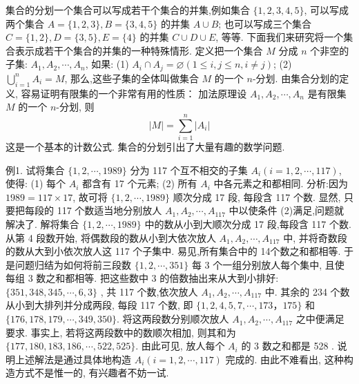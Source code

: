 
集合的分划一个集合可以写成若干个集合的并集,例如集合 $\{1,2, 3, 4, 5\}$, 可以写成两个集合 $A=\{1,2,3\}, B=\{3,4,5\}$ 的并集 $A \cup B$; 也可以写成三个集合 $C=\{1,2\}, D=\{3,5\}, E=\{4\}$ 的并集 $C \cup D \cup E$, 等等.
下面我们来研究将一个集合表示成若干个集合的并集的一种特殊情形.
定义把一个集合 $M$ 分成 $n$ 个非空的子集: $A_1, A_2, \cdots, A_n$, 如果:
(1) $A_i \cap A_j=\varnothing(1 \leqslant i, j \leqslant n, i \neq j)$;
(2) $\bigcup_{i=1}^n A_i=M$,
那么,这些子集的全体叫做集合 $M$ 的一个 $n$-分划.
由集合分划的定义, 容易证明有限集的一个非常有用的性质：
加法原理设 $A_1, A_2, \cdots, A_n$ 是有限集 $M$ 的一个 $n$-分划, 则
$$
|M|=\sum_{i=1}^n\left|A_i\right|
$$
这是一个基本的计数公式.
集合的分划引出了大量有趣的数学问题.



例1. 试将集合 $\{1,2, \cdots, 1989\}$ 分为 117 个互不相交的子集 $A_i ( i=1, 2, \cdots, 117)$, 使得:
(1) 每个 $A_i$ 都含有 17 个元素;
(2) 所有 $A_i$ 中各元素之和都相同.
分析:因为 $1989=117 \times 17$, 故可将 $\{1,2, \cdots, 1989\}$ 顺次分成 17 段, 每段含 117 个数.
显然, 只要把每段的 117 个数适当地分别放人 $A_1, A_2, \cdots, A_{117}$ 中以使条件 (2)满足,问题就解决了.
解将集合 $\{1,2, \cdots, 1989\}$ 中的数从小到大顺次分成 17 段,每段含 117 个数.
从第 4 段数开始, 将偶数段的数从小到大依次放人 $A_1, A_2, \cdots, A_{117}$ 中, 并将奇数段的数从大到小依次放人这 117 个子集中.
易见,所有集合中的 14个数之和都相等.
于是问题归结为如何将前三段数 $\{1,2, \cdots, 351\}$ 每 3 个一组分别放人每个集中, 且使每组 3 数之和都相等.
把这些数中 3 的倍数抽出来从大到小排好: $\{351,348,345, \cdots, 6,3\}$ , 共 117 个数,依次放人 $A_1, A_2, \cdots, A_{117}$ 中.
其余的 234 个数从小到大排列并分成两段, 每段 117 个数, 即 $\{1,2,4,5,7, \cdots, 173 ， 175\}$ 和 $\{176,178,179, \cdots, 349,350\}$. 将这两段数分别顺次放人 $A_1, A_2, \cdots, A_{117}$ 之中便满足要求.
事实上, 若将这两段数中的数顺次相加, 则其和为 $\{177,180,183,186, \cdots, 522,525\}$. 由此可见, 放人每个 $A_i$ 的 3 数之和都是 528 .
说明上述解法是通过具体地构造 $A_i(i=1,2, \cdots, 117)$ 完成的.
由此不难看出, 这种构造方式不是惟一的, 有兴趣者不妨一试.



